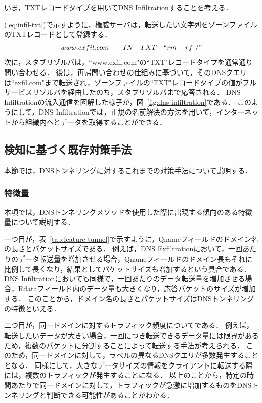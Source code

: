 いま，TXTレコードタイプを用いてDNS Infiltrationすることを考える．

(\ref{eq:infil-txt})で示すように，権威サーバは，転送したい文字列をゾーンファイルのTXTレコードとして登録する．
\begin{eqnarray}
 www.exfil.com \qquad IN \quad TXT \quad ``rm -rf \ /"
 \label{eq:infil-txt}
\end{eqnarray}
次に，スタブリゾルバは，``www.exfil.com"の``TXT"レコードタイプを通常通り問い合わせる．
後は，再帰問い合わせの仕組みに基づいて，そのDNSクエリは``exfil.com"まで転送され，ゾーンファイルの``TXT"レコードタイプの値がフルサービスリゾルバを経由したのち，スタブリゾルバまで応答される．
DNS Infiltrationの流入通信を図解した様子が，図~\ref{fig:dns-infiltration}である．
このようにして，DNS Infiltrationでは，正規の名前解決の方法を用いて，インターネットから組織内へとデータを取得することができる．


\subsection{検知に基づく既存対策手法}
本節では，DNSトンネリングに対するこれまでの対策手法について説明する．
\subsubsection{特徴量}
本項では，DNSトンネリングメソッドを使用した際に出現する傾向のある特徴量について説明する．

一つ目が，表~\ref{tab:feature-tunnel}で示すように，Qnameフィールドのドメイン名の長さとパケットサイズである．
例えば，DNS Exfiltrationにおいて，一回あたりのデータ転送量を増加させる場合，Qnameフィールドのドメイン長もそれに比例して長くなり，結果としてパケットサイズも増加するという具合である．
DNS Infiltrationにおいても同様で，一回あたりのデータ転送量を増加させる場合，Rdataフィールド内のデータ量も大きくなり，応答パケットのサイズが増加する．
このことから，ドメイン名の長さとパケットサイズはDNSトンネリングの特徴といえる．



二つ目が，同一ドメインに対するトラフィック頻度についてである．
例えば，転送したいデータが大きい場合，一回につき転送できるデータ量には限界があるため，複数のパケットに分割することによって転送する手法が考えられる．
このため，同一ドメインに対して，ラベルの異なるDNSクエリが多数発生することとなる．
同様にして，大きなデータサイズの情報をクライアントに転送する際には，複数のトラフィックが発生することになる．
以上のことから，特定の時間あたりで同一ドメインに対して，トラフィックが急激に増加するものをDNSトンネリングと判断できる可能性があることがわかる．

